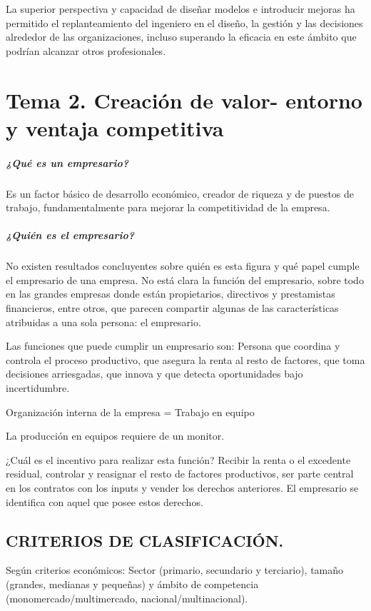 \documentclass[12pt, twoside, openright]{report} %
\begin{document}
La superior perspectiva y capacidad de diseñar modelos e introducir mejoras ha permitido el replanteamiento del ingeniero en el diseño, la gestión y las decisiones alrededor de las organizaciones, incluso superando la eficacia en este ámbito que podrían alcanzar otros profesionales.



\chapter{Tema 2. Creación de valor- entorno y ventaja competitiva}
\paragraph{¿Qué es un empresario?} Es un factor básico de desarrollo económico, creador de riqueza y de puestos de trabajo, fundamentalmente para mejorar la competitividad de la empresa.

\paragraph{¿Quién es el empresario?} No existen resultados concluyentes sobre quién es esta figura y qué papel cumple el empresario de una empresa. No está clara la función del empresario, sobre todo en las grandes empresas donde están propietarios, directivos y prestamistas financieros, entre otros, que parecen compartir algunas de las características atribuidas a una sola persona: el empresario.

Las funciones que puede cumplir un empresario son: Persona que coordina y controla el proceso productivo, que asegura la renta al resto de factores, que toma decisiones arriesgadas, que innova y que detecta oportunidades bajo incertidumbre.

Organización interna de la empresa = Trabajo en equipo

La producción en equipos requiere de un monitor.

¿Cuál es el incentivo para realizar esta función? Recibir la renta o el excedente residual, controlar y reasignar el resto de factores productivos, ser parte central en los contratos con los inputs y vender los derechos anteriores. El empresario se identifica con aquel que posee estos derechos.

\section{CRITERIOS DE CLASIFICACIÓN.}
Según criterios económicos: Sector (primario, secundario y terciario), tamaño (grandes, medianas y pequeñas) y ámbito de competencia (monomercado/multimercado, nacional/multinacional).
\end{document}
